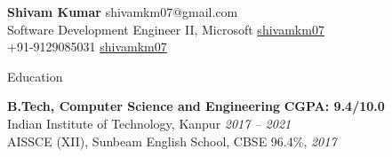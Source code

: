 \documentclass[9pt]{extarticle}
\newcommand{\cvsection}[1]{
  \vspace{4mm}
  {\sc \fontsize{9.5pt}{11pt}\selectfont #1}
  \vspace{-1.5mm}
  \hrulefill
  \vspace{2mm}
}
\begin{document}

\begingroup
{}

\begin{minipage}[t]{\textwidth}
{\Huge\textbf{\sc Shivam Kumar}}
\hfill
shivamkm07@gmail.com \faEnvelope
\\
Software Development Engineer II, Microsoft
\hfill
\href{https://github.com/shivamkm07}{shivamkm07 \faGithub}
\\
+91-9129085031 \faMobile
\hfill
\href{https://www.linkedin.com/in/shivamkm07}{shivamkm07 \faLinkedin}
\end{minipage}

\vspace{0mm}

\cvsection{Education}
\vspace{1mm}
{\small \textbf{B.Tech, Computer Science and Engineering}}
\hfill {\small \textbf{CGPA: 9.4/10.0}} \\[-1pt]
{\small Indian Institute of Technology, Kanpur}
\hfill {\small \emph{2017 -- 2021}}
\\[2pt]
{\small AISSCE (XII), Sunbeam English School, CBSE}
\hfill {\small 96.4\%, \emph{2017}}

\vspace{2mm}
\end{document}
